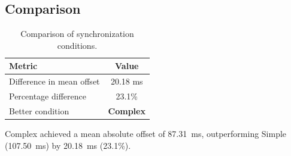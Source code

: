 \subsection*{Comparison}

\begin{table}[h!]
\centering
\begin{tabular}{|l|c|}
\hline
Metric & Value \\
\hline
Difference in mean offset & 20.18 ms \\
Percentage difference & 23.1\% \\
Better condition & \textbf{Complex} \\
\hline
\end{tabular}
\caption{Comparison of synchronization conditions.}
\label{tab:sync_comparison}
\end{table}

Complex achieved a mean absolute offset of 87.31~ms, outperforming Simple (107.50~ms) by 20.18~ms (23.1\%).
